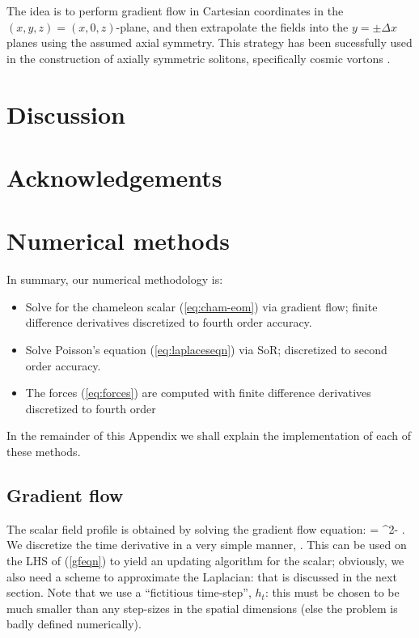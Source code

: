 \documentclass[a4paper, 12pt]{article}
\numberwithin{equation}{section}
\begin{document}
The idea is to perform gradient flow in Cartesian coordinates in the $(x,y,z) = (x,0,z)$-plane, and then extrapolate the fields into the $y = \pm \Delta x$ planes using the assumed axial symmetry. This strategy has been sucessfully used in the construction of axially symmetric solitons, specifically cosmic vortons  \cite{Battye:2008mm}.

\section{Discussion}


\section*{Acknowledgements}

\appendix
\section{Numerical methods}
\label{sec:nummethods}
In summary, our numerical methodology is:
\begin{itemize}
\item Solve for the chameleon scalar (\ref{eq:cham-eom}) via gradient flow; finite difference derivatives discretized to fourth order accuracy.
\item Solve Poisson's equation (\ref{eq:laplaceseqn}) via SoR; discretized to second order accuracy.
\item The forces (\ref{eq:forces}) are computed with finite difference derivatives discretized to fourth order
\end{itemize}
In the remainder of this Appendix we shall explain the implementation of each of these methods.

\subsection{Gradient flow}
The scalar field profile is obtained by solving the gradient flow equation:
\bea
\label{gfeqn}
\dot{\phi} = \nabla^2\phi - .
\eea
We discretize the time derivative in a very simple manner,
\bea
\dot{\phi} \approx {}.
\eea
This can be used on the LHS of (\ref{gfeqn}) to yield an updating algorithm for the scalar; obviously, we also need a scheme to approximate the Laplacian: that is discussed in the next section. Note that we use a ``fictitious time-step'', $h_t$: this must be chosen to be much smaller than any  step-sizes in the spatial dimensions (else the problem is badly defined numerically).
\end{document}
